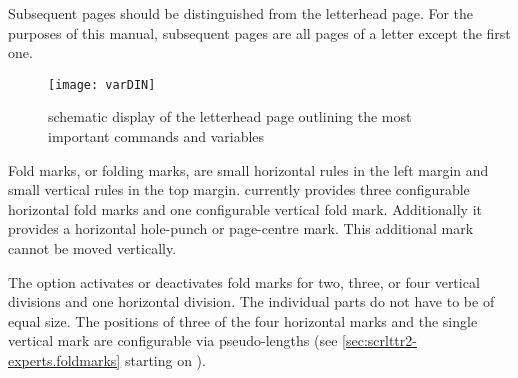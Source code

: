 Subsequent pages should be
distinguished from the letterhead page. For the purposes of this manual,
subsequent pages are all pages of a letter except the first one.


\begin{figure}
  \centering
  \texttt{[image: varDIN]}
  \caption{schematic display of the letterhead page outlining the most
    important commands and variables}
  \label{fig:\LabelBase.variables}
\end{figure}


\begin{Declaration}
\end{Declaration}
Fold marks, or folding marks, are small horizontal rules in
the left margin and small vertical rules in the top margin. \KOMAScript{}
currently provides three configurable horizontal fold marks and one
configurable vertical fold mark. Additionally it provides a horizontal
hole-punch or page-centre mark. This additional mark cannot be moved
vertically.

The  option activates or deactivates fold marks for two,
three, or four vertical divisions and one horizontal division. The individual
parts do not have to be of equal size. The positions of three of the four
horizontal marks and the single vertical mark are configurable via
pseudo-lengths (see \autoref{sec:scrlttr2-experts.foldmarks} starting on
).

